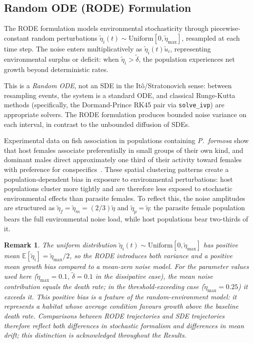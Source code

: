\documentclass[12pt]{article}
\newtheorem{remark}{Remark}
\begin{document}
\subsection{Random ODE (RODE) Formulation}

The RODE formulation models environmental stochasticity through piecewise-constant random perturbations $\tilde{\eta}_i(t) \sim \mathrm{Uniform}[0, \tilde{\eta}_{\max}]$, resampled at each time step.  The noise enters multiplicatively as $\tilde{\eta}_i(t) \tilde{u}_i$, representing environmental surplus or deficit: when $\tilde{\eta}_i > \tilde{\delta}$, the population experiences net growth beyond deterministic rates.

This is a \emph{Random ODE}, not an SDE in the It\^{o}/Stratonovich sense: between resampling events, the system is a standard ODE, and classical Runge-Kutta methods (specifically, the Dormand-Prince RK45 pair via \texttt{solve\_ivp}) are appropriate solvers.  The RODE formulation produces bounded noise variance on each interval, in contrast to the unbounded diffusion of SDEs.

Experimental data on fish association in populations containing
\textit{P.~formosa} show that host females associate preferentially
in small groups of their own kind, and dominant males direct
approximately one third of their activity toward females with
preference for conspecifics~\citep{Balsano1989}.  These spatial
clustering patterns create a population-dependent bias in exposure
to environmental perturbations: host populations cluster more tightly
and are therefore less exposed to stochastic environmental effects
than parasite females.  To reflect this, the noise amplitudes are
structured as $\tilde{\eta}_f = \tilde{\eta}_m = (2/3)\tilde{\eta}$
and $\tilde{\eta}_p = \tilde{\eta}$: the parasite female population
bears the full environmental noise load, while host populations bear
two-thirds of it.

\begin{remark}
The uniform distribution $\tilde\eta_i(t)\sim\mathrm{Uniform}[0,\tilde\eta_{\max}]$
has positive mean $\mathbb{E}[\tilde\eta_i]=\tilde\eta_{\max}/2$, so the RODE
introduces both variance and a positive mean growth bias compared to a
mean-zero noise model.  For the parameter values used here
($\tilde\eta_{\max}=0.1$, $\tilde\delta=0.1$ in the dissipative case),
the mean noise contribution equals the death rate; in the
threshold-exceeding case ($\tilde\eta_{\max}=0.25$) it exceeds it.
This positive bias is a feature of the random-environment model: it
represents a habitat whose average condition favours growth above the
baseline death rate.  Comparisons between RODE trajectories and SDE
trajectories therefore reflect both differences in stochastic formalism
and differences in mean drift; this distinction is acknowledged
throughout the Results.
\end{remark}
\end{document}
